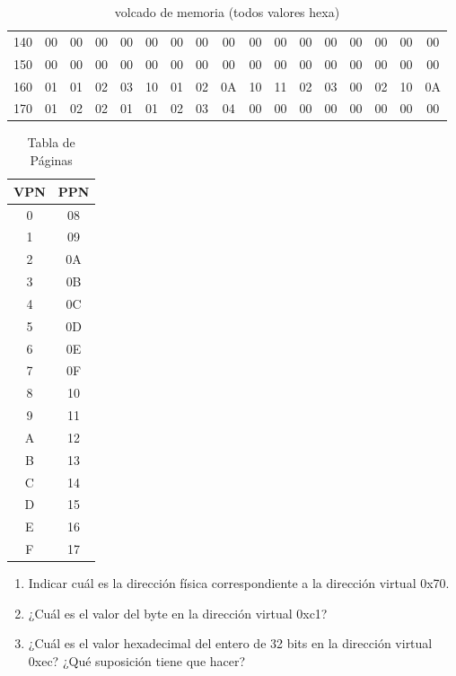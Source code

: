 \begin{table}[!ht]
\begin{center}
\begin{tabular}{c cccccccccccccccc}
      140 & 00 & 00 & 00 & 00 & 00 & 00 & 00 & 00 & 00 & 00 & 00 & 00 & 00 & 00 & 00 & 00 \\
      150 & 00 & 00 & 00 & 00 & 00 & 00 & 00 & 00 & 00 & 00 & 00 & 00 & 00 & 00 & 00 & 00 \\
      160 & 01 & 01 & 02 & 03 & 10 & 01 & 02 & 0A & 10 & 11 & 02 & 03 & 00 & 02 & 10 & 0A \\
      170 & 01 & 02 & 02 & 01 & 01 & 02 & 03 & 04 & 00 & 00 & 00 & 00 & 00 & 00 & 00 & 00
      \end{tabular}
      \caption{volcado de memoria (todos valores hexa)}
      \label{t_vm_dump}
    \end{center}
    \end{table}


    \begin{table}[h]
    \begin{center}
    \begin{tabular}{c|c}VPN & PPN \\ \hline
    0 & 08 \\
    1 & 09 \\
    2 & 0A \\
    3 & 0B \\
    4 & 0C \\
    5 & 0D \\
    6 & 0E \\
    7 & 0F \\
    8 & 10 \\
    9 & 11 \\
    A & 12 \\
    B & 13 \\
    C & 14 \\
    D & 15 \\
    E & 16 \\
    F & 17
    \end{tabular}
    \caption{Tabla de Páginas}
    \label{t_vm_pgt}
    \end{center}
    \end{table}

\begin{enumerate}
 \item Indicar cuál es la dirección fí­sica correspondiente a la dirección virtual 0x70.
 \item ¿Cuál es el valor del byte en la dirección virtual 0xc1?
 \item ¿Cuál es el valor hexadecimal del entero de 32 bits en la dirección virtual 0xec? ¿Qué suposición tiene que hacer?
\end{enumerate}

